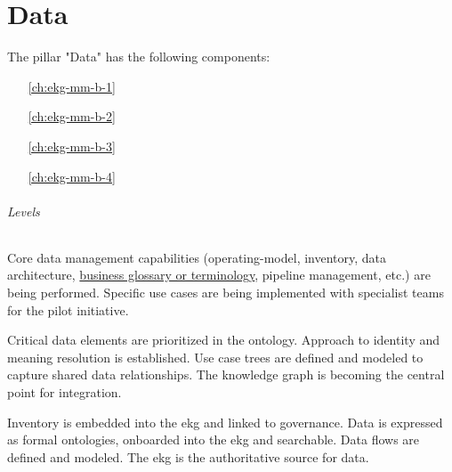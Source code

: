 \part{Data}\label{pt:ekgmm-b} %

The pillar "Data" has the following components:

\begin{itemize}[leftmargin=.5in]
  \item [\ref{ch:ekg-mm-b-1}] 
  \item [\ref{ch:ekg-mm-b-2}] 
  \item [\ref{ch:ekg-mm-b-3}] 
  \item [\ref{ch:ekg-mm-b-4}] 
\end{itemize}

\paragraph{Levels}

\begin{description}[nosep,font=\bfseries]

    \item [1. \ekgmmLevelOneLabel]
    Core data management capabilities (\gls{operating-model}, inventory, data architecture,
    \hyperref[sec:ekg-mm-business-terminology]{business glossary or terminology},
    pipeline management, etc.) are being performed.
    Specific use cases are being implemented with specialist teams for the pilot initiative.
    
    \item [2. \ekgmmLevelTwoLabel]
    Critical data elements are prioritized in the ontology.
    Approach to identity and meaning resolution is established.
    Use case trees are defined and modeled to capture shared data relationships.
    The knowledge graph is becoming the central point for integration.

    \item [3. \ekgmmLevelThreeLabel]
    Inventory is embedded into the \gls{ekg} and linked to governance.
    Data is expressed as formal ontologies, onboarded into the \gls{ekg} and searchable.
    Data flows are defined and modeled.
    The \gls{ekg} is the authoritative source for data.

\end{description}





